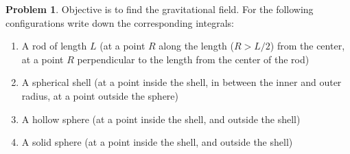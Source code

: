 \documentclass[10pt]{article}
\theoremstyle{definition}
\newtheorem{problem}{Problem}
\begin{document}
\begin{problem}
Objective is to find the
gravitational field. For the following configurations write down the corresponding
integrals:
\begin{enumerate}[label=(\alph*)]
  \item A rod of length $L$ (at a point $R$ along the length ($R>L/2$) from the center, at a point $R$
        perpendicular to the length from the center of the rod)
  \item A spherical shell (at a point inside the shell, in between the inner and outer radius, at a
        point outside the sphere)
  \item A hollow sphere (at a point inside the shell, and outside the shell)
  \item A solid sphere (at a point inside the shell, and outside the shell)
\end{enumerate}
\end{problem}
\end{document}
